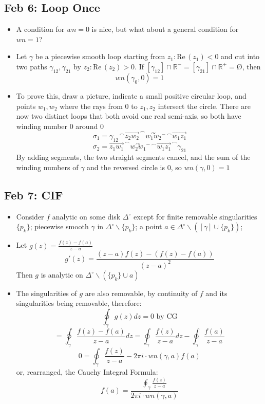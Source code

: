 \documentclass[10pt, oneside]{article}
\newcommand{\cat}{^{\,\smallfrown}}
\newcommand{\R}{\mathbb{R}}
\let\foo\O
\renewcommand{\O}{\text{\foo}}
\renewcommand{\Re}{\text{Re} \,}
\begin{document}
\subsection{Feb 6: Loop Once}
\begin{itemize}
    \item A condition for $wn = 0$ is nice, but what about a general condition for $wn = 1$?
    \item Let $\gamma$ be a piecewise smooth loop starting from $z_1: \Re(z_1) < 0$ and cut into two paths $\gamma_{12},\gamma_{21}$ by $z_2: \Re(z_2) > 0$. If $[\gamma_{12}] \cap \R^- = [\gamma_{21}] \cap \R^+ = \O$, then
        \[wn(\gamma_0,0) = 1\]
    \item To prove this, draw a picture, indicate a small positive circular loop, and points $w_1,w_2$ where the rays from $0$ to $z_1,z_2$ intersect the circle. There are now two distinct loops that both avoid one real semi-axis, so both have winding number $0$ around $0$
        \[\sigma_1 = {\gamma_{12}} \cat \overrightarrow{z_2 w_2} \cat \overset{\curvearrowright}{w_1 w_2} {}^- {}\cat \overrightarrow{w_1 z_1}\]
        \[\sigma_2 = \overrightarrow{z_1 w_1} \cat \overset{\curvearrowright}{w_2 w_1} {}^- {}\cat \overrightarrow{w_1 z_1} \cat \gamma_{21}\]
        By adding segments, the two straight segments cancel, and the sum of the winding numbers of $\gamma$ and the reversed circle is 0, so $wn(\gamma,0) = 1$
\end{itemize}

\subsection{Feb 7: CIF}
\begin{itemize}
    \item Consider $f$ analytic on some disk $\Delta^\circ$ except for finite removable singularities $\{p_k\}$; piecewise smooth $\gamma$ in $\Delta^\circ \backslash \{p_k\}$; a point $a \in \Delta^\circ \backslash ([\gamma] \cup \{p_k\})$; 
    \item Let $g(z) = \frac{f(z) - f(a)}{z - a}$
        \[g'(z) = \frac{(z-a)f(z) - (f(z) - f(a))}{(z-a)^2}\]
        Then $g$ is analytic on $\Delta^\circ \backslash (\{p_k\} \cup a)$
    \item The singularities of $g$ are also removable, by continuity of $f$ and its singularities being removable, therefore:
        \[\oint_\gamma g(z) dz = 0 \text{ by CG}\]
        \[= \oint_\gamma \frac{f(z) - f(a)}{z-a} dz = \oint_\gamma \frac{f(z)}{z-a} dz - \oint_\gamma \frac{f(a)}{z-a}\]
        \[0 = \oint_\gamma \frac{f(z)}{z-a} - 2\pi i \cdot wn(\gamma,a) f(a)\]
        or, rearranged, the Cauchy Integral Formula:
        \[f(a) = \frac{\oint_\gamma \frac{f(z)}{z-a}}{2\pi i \cdot wn(\gamma,a)}\]
\end{itemize}
\end{document}

